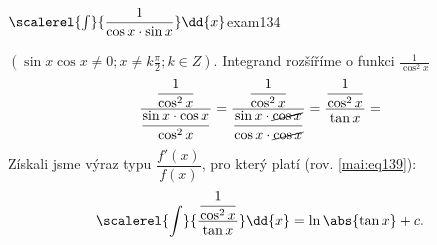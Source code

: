\begin{mathexam}{\(\scalerel{\int}{\dfrac{1}{\cos x\cdot\sin
   x}}\dd{x}\)\hfill\cite[s.~31]{Knichal}}{exam134} 
   
   \((\sin x\cos x\neq0; x\neq k\frac{\pi}{2}; k\in Z)\). Integrand rozšíříme o funkci
   \(\frac{1}{\cos^2x}\)
  \begin{equation*}
    \dfrac{\dfrac{1}{\cos^2x}}{\dfrac{\sin x\cdot\cos x}{\cos^2x}}  = 
    \dfrac{\dfrac{1}{\cos^2x}}{\dfrac{\sin x\cdot\cancel{\cos x}}{\cos x\cdot\cancel{\cos x}}} = 
    \dfrac{\dfrac{1}{\cos^2x}}{\tan x} = 
  \end{equation*}  
  Získali jsme výraz typu \(\dfrac{f'(x)}{f(x)}\), pro který platí (rov. \ref{mai:eq139}):  
  \begin{equation*}
    \scalerel{\int}{\dfrac{\dfrac{1}{\cos^2x}}{\tan x}}\dd{x} = \ln\abs{\tan x} + c.
  \end{equation*}    
\end{mathexam}